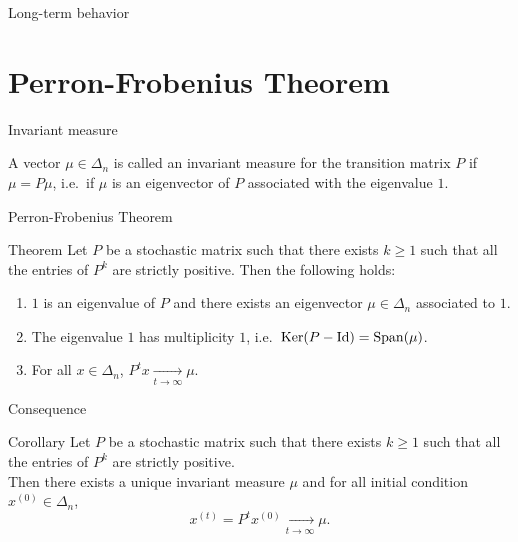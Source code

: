 \documentclass{beamer}
\begin{document}
\begin{frame}[t]{Long-term behavior}
	\grid


\end{frame}

\section{Perron-Frobenius Theorem}

\begin{frame}[t]{Invariant measure}
	\grid
	\begin{definition}
		A vector $\mu \in \Delta_n$ is called an invariant measure for the transition matrix $P$ if $\mu = P \mu$, i.e.\ if $\mu$ is an eigenvector of $P$ associated with the eigenvalue $1$.
	\end{definition}


\end{frame}

\begin{frame}[t]{Perron-Frobenius Theorem}
	\grid
	\begin{block}{Theorem}
		Let $P$ be a stochastic matrix such that there exists $k \geq 1$ such that all the entries of $P^k$ are strictly positive. Then the following holds:
		\begin{enumerate}
			\vspace{0.3cm}
		\item $1$ is an eigenvalue of $P$ and there exists an eigenvector $\mu \in \Delta_n$ associated to $1$.
			\vspace{0.3cm}
		\item The eigenvalue $1$ has multiplicity $1$, i.e.\ ${{\rm Ker}}(P-{{\rm Id}}) = {{\rm Span}}(\mu)$.
			\vspace{0.3cm}
		\item For all $x \in \Delta_n$, $P^t x \xrightarrow[t \to \infty]{} \mu$.
	\end{enumerate}
\end{block}
\end{frame}


\begin{frame}[t]{Consequence}
	\grid
	\begin{block}{Corollary}
		Let $P$ be a stochastic matrix such that there exists $k \geq 1$ such that all the entries of $P^k$ are strictly positive. 
		\\

		Then there exists a unique invariant measure $\mu$ and for all initial condition $x^{(0)} \in \Delta_n$,
		$$
		x^{(t)} = P^t x^{(0)} \xrightarrow[t \to \infty]{} \mu.
		$$
	\end{block}
\end{frame}
\end{document}
